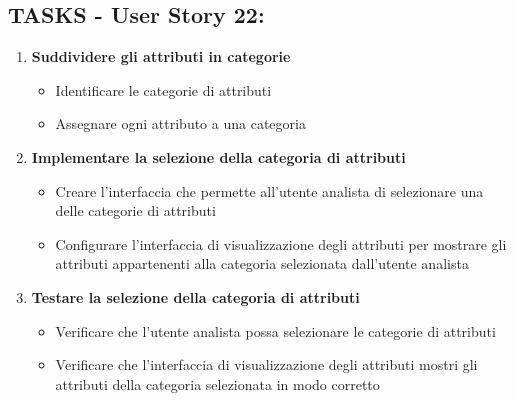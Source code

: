     \subsection*{TASKS - User Story 22:}  
    \begin{enumerate} 
        \item \textbf{Suddividere gli attributi in categorie}  
            \begin{itemize}  
                \item Identificare le categorie di attributi
                \item Assegnare ogni attributo a una categoria
            \end{itemize} 
        \item \textbf{Implementare la selezione della categoria di attributi}  
            \begin{itemize}  
                \item Creare l'interfaccia che permette all'utente analista di selezionare una delle categorie di attributi
                \item Configurare l'interfaccia di visualizzazione degli attributi per mostrare gli attributi appartenenti alla categoria selezionata dall'utente analista
            \end{itemize} 
        \item \textbf{Testare la selezione della categoria di attributi}  
            \begin{itemize}  
                \item Verificare che l'utente analista possa selezionare le categorie di attributi
                \item Verificare che l'interfaccia di visualizzazione degli attributi mostri gli attributi della categoria selezionata in modo corretto
            \end{itemize} 
    \end{enumerate}